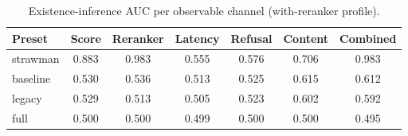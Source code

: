 \begin{table}[tbp]
\centering
\footnotesize
\setlength{\tabcolsep}{2.5pt}
\caption{Existence-inference AUC per observable channel (with-reranker profile).}
\label{tab:rq3chan}
\begin{tabular}{lcccccc}
\toprule
Preset & Score & Reranker & Latency & Refusal & Content & Combined \\
\midrule
strawman & 0.883 & 0.983 & 0.555 & 0.576 & 0.706 & 0.983 \\
baseline & 0.530 & 0.536 & 0.513 & 0.525 & 0.615 & 0.612 \\
legacy & 0.529 & 0.513 & 0.505 & 0.523 & 0.602 & 0.592 \\
full & 0.500 & 0.500 & 0.499 & 0.500 & 0.500 & 0.495 \\
\bottomrule
\end{tabular}
\end{table}
